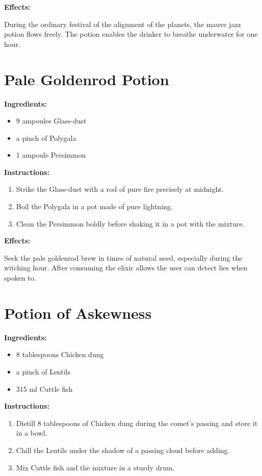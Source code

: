 \documentclass{article}
\begin{document}
\textbf{Effects:}

During the ordinary festival of the alignment of the planets, the mauve jazz potion flows freely. The potion enables the drinker to breathe underwater for one hour.

\newpage
\section*{Pale Goldenrod Potion}

\textbf{Ingredients:}

\begin{itemize}
  \item 9 ampoules Glass-dust
  \item a pinch of Polygala
  \item 1 ampoule Persimmon
\end{itemize}

\textbf{Instructions:}

\begin{enumerate}
  \item Strike the Glass-dust with a rod of pure fire precisely at midnight.
  \item Boil the Polygala in a pot made of pure lightning.
  \item Clean the Persimmon boldly before shaking it in a pot with the mixture.
\end{enumerate}

\textbf{Effects:}

Seek the pale goldenrod brew in times of natural need, especially during the witching hour. After consuming the elixir allows the user can detect lies when spoken to.

\newpage
\section*{Potion of Askewness}

\textbf{Ingredients:}

\begin{itemize}
  \item 8 tablespoons Chicken dung
  \item a pinch of Lentils
  \item 315 ml Cuttle fish
\end{itemize}

\textbf{Instructions:}

\begin{enumerate}
  \item Distill 8 tablespoons of Chicken dung during the comet’s passing and store it in a bowl.
  \item Chill the Lentils under the shadow of a passing cloud before adding.
  \item Mix Cuttle fish and the mixture in a sturdy drum.
\end{enumerate}
\end{document}
